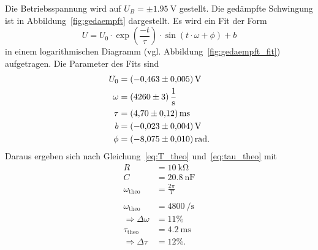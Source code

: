 Die Betriebsspannung wird auf $U_B = \pm \SI{1.95}{\volt}$ gestellt.
Die gedämpfte Schwingung ist in Abbildung~\ref{fig:gedaempft} dargestellt.
Es wird ein Fit der Form
\begin{equation}
U = U_0 \cdot \exp{\left(\frac{-t}{\tau}\right)} \cdot \sin{\left(t \cdot \omega  + \phi\right)} + b
\end{equation}
in einem logarithmischen Diagramm (vgl. Abbildung~\ref{fig:gedaempft_fit}) aufgetragen.
Die Parameter des Fits sind
\begin{align*}
  U_0 &= \SI{-0.463 \pm 0.005}{\volt} \\
  \omega &= \SI{4260 \pm 3}{\per\second} \\
  \tau &= \SI{4.7 \pm 0.12}{\milli\second} \\
  b &= \SI{-0.023 \pm 0.004}{\volt} \\
  \phi &= \SI{-8.075 \pm 0.01}{\radian}.
\end{align*}
Daraus ergeben sich nach Gleichung~\eqref{eq:T_theo} und~\eqref{eq:tau_theo} mit
\begin{align*}
  R &= \SI{10}{\kilo\ohm} \\
  C &= \SI{20.8}{\nano\farad} \\
  \omega_\text{theo} &= \frac{2 \pi}{T} \\
  \\
  \omega_\text{theo} &= \SI{4800}{\per\second} \\
  \Rightarrow \Delta \omega &= \num{11}\% \\
  \tau_\text{theo} &= \SI{4.2}{\milli\second} \\
  \Rightarrow \Delta \tau &= \num{12}\%.
\end{align*}
